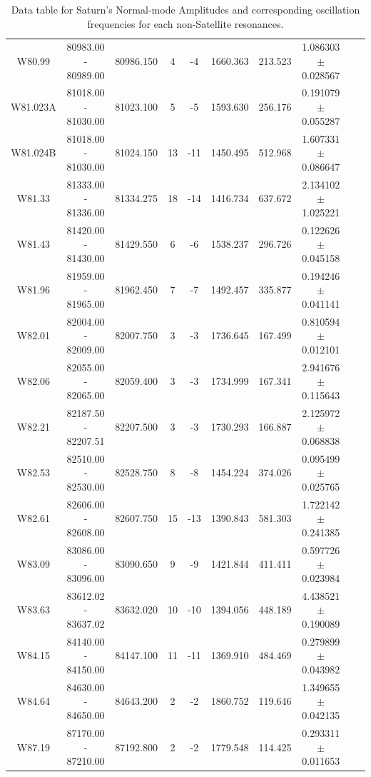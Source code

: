 \documentclass{article}
\begin{document}
\begin{table}[h]
{\begin{tabular}{|c|c|c|c|c|c|c|c|c|c|}
W80.99 & 80983.00 - 80989.00 & 80986.150 & 4 & -4 & 1660.363 & 213.523 & 1.086303 $\pm$ 0.028567 \\
W81.023A & 81018.00 - 81030.00 & 81023.100 & 5 & -5 & 1593.630 & 256.176 & 0.191079 $\pm$ 0.055287 \\
W81.024B & 81018.00 - 81030.00 & 81024.150 & 13 & -11 & 1450.495 & 512.968 & 1.607331 $\pm$ 0.086647 \\
W81.33 & 81333.00 - 81336.00 & 81334.275 & 18 & -14 & 1416.734 & 637.672 & 2.134102 $\pm$ 1.025221 \\
W81.43 & 81420.00 - 81430.00 & 81429.550 & 6 & -6 & 1538.237 & 296.726 & 0.122626 $\pm$ 0.045158 \\
W81.96 & 81959.00 - 81965.00 & 81962.450 & 7 & -7 & 1492.457 & 335.877 & 0.194246 $\pm$ 0.041141 \\
W82.01 & 82004.00 - 82009.00 & 82007.750 & 3 & -3 & 1736.645 & 167.499 & 0.810594 $\pm$ 0.012101 \\
W82.06 & 82055.00 - 82065.00 & 82059.400 & 3 & -3 & 1734.999 & 167.341 & 2.941676 $\pm$ 0.115643 \\
W82.21 & 82187.50 - 82207.51 & 82207.500 & 3 & -3 & 1730.293 & 166.887 & 2.125972 $\pm$ 0.068838 \\
W82.53 & 82510.00 - 82530.00 & 82528.750 & 8 & -8 & 1454.224 & 374.026 & 0.095499 $\pm$ 0.025765 \\
W82.61 & 82606.00 - 82608.00 & 82607.750 & 15 & -13 & 1390.843 & 581.303 & 1.722142 $\pm$ 0.241385 \\
W83.09 & 83086.00 - 83096.00 & 83090.650 & 9 & -9 & 1421.844 & 411.411 & 0.597726 $\pm$ 0.023984 \\
W83.63 & 83612.02 - 83637.02 & 83632.020 & 10 & -10 & 1394.056 & 448.189 & 4.438521 $\pm$ 0.190089 \\
W84.15 & 84140.00 - 84150.00 & 84147.100 & 11 & -11 & 1369.910 & 484.469 & 0.279899 $\pm$ 0.043982 \\
W84.64 & 84630.00 - 84650.00 & 84643.200 & 2 & -2 & 1860.752 & 119.646 & 1.349655 $\pm$ 0.042135 \\
W87.19 & 87170.00 - 87210.00 & 87192.800 & 2 & -2 & 1779.548 & 114.425 & 0.293311 $\pm$ 0.011653 \\
\hline
\end{tabular}
\vspace{-1.5cm}
}
\caption{Data table for Saturn's Normal-mode Amplitudes and corresponding oscillation frequencies for each non-Satellite resonances.}
\end{table}
\end{document}
